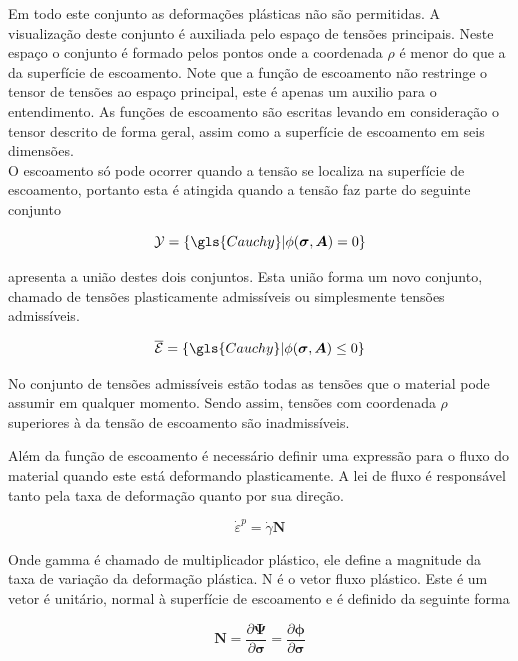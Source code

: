Em todo este conjunto as deformações plásticas não são permitidas. A visualização deste conjunto é auxiliada pelo espaço de tensões principais. Neste espaço o conjunto é formado pelos pontos onde a coordenada $\rho$ é menor do que a da superfície de escoamento. Note que a função de escoamento não restringe o tensor de tensões ao espaço principal, este é apenas um auxilio para o entendimento. As funções de escoamento são escritas levando em consideração o tensor descrito de forma geral, assim como a superfície de escoamento em seis dimensões.\\

O escoamento só pode ocorrer quando a tensão se localiza na superfície de escoamento, portanto esta é atingida quando a tensão faz parte do seguinte conjunto

\begin{equation}
    \mathcal{Y} = \{ \gls{Cauchy} | \phi(\boldsymbol{\sigma}, \boldsymbol{A}) = 0   \}
\end{equation}


\cite{neto_peric_owens_2008} apresenta a união destes dois conjuntos. Esta união forma um novo conjunto, chamado de tensões plasticamente admissíveis ou simplesmente tensões admissíveis.

\begin{equation}
    \overline{\mathcal{E}} = \{ \gls{Cauchy} | \phi(\boldsymbol{\sigma}, \boldsymbol{A}) \leq 0   \}
\end{equation}

No conjunto de tensões admissíveis estão todas as tensões que o material pode assumir em qualquer momento. Sendo assim, tensões com coordenada $\rho$ superiores à da tensão de escoamento são inadmissíveis. \par

Além da função de escoamento é necessário definir uma expressão para o fluxo do material quando este está deformando plasticamente. A lei de fluxo é responsável tanto pela taxa de deformação quanto por sua direção.

\begin{equation}
    \dot{\varepsilon}^p = \dot{\gamma} \boldsymbol{N}
\end{equation}

Onde \gls{gamma} é chamado de multiplicador plástico, ele define a magnitude da taxa de variação da deformação plástica.  \gls{N} é o vetor fluxo plástico. Este é um vetor é unitário, normal à superfície de escoamento e é definido da seguinte forma

\begin{equation}
    \boldsymbol{N} = \frac{\partial \boldsymbol{\Psi}}{\partial \boldsymbol{\sigma}} = \frac{\partial \boldsymbol{\phi}}{\partial \boldsymbol{\sigma}}
\end{equation}

